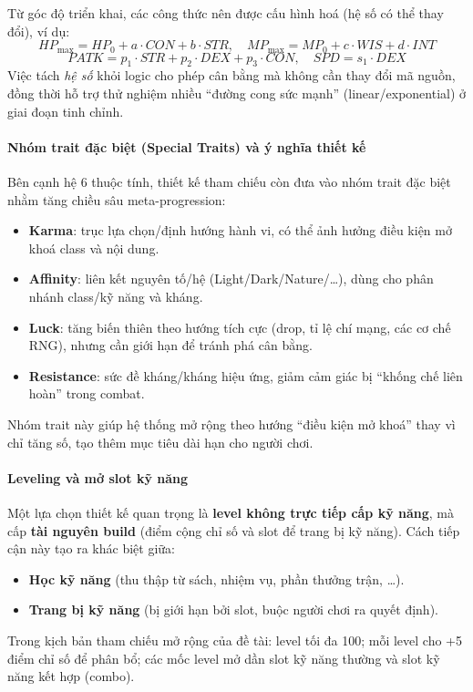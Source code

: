 Từ góc độ triển khai, các công thức nên được cấu hình hoá (hệ số có thể thay đổi), ví dụ:
\[
HP_{\max} = HP_0 + a\cdot CON + b\cdot STR,\quad
MP_{\max} = MP_0 + c\cdot WIS + d\cdot INT
\]
\[
PATK = p_1\cdot STR + p_2\cdot DEX + p_3\cdot CON,\quad
SPD = s_1\cdot DEX
\]
Việc tách \textit{hệ số} khỏi logic cho phép cân bằng mà không cần thay đổi mã nguồn, đồng thời hỗ trợ thử nghiệm nhiều ``đường cong sức mạnh'' (linear/\allowbreak exponential) ở giai đoạn tinh chỉnh\cite{adams-game-design}.

\paragraph{Nhóm trait đặc biệt (Special Traits) và ý nghĩa thiết kế}
Bên cạnh hệ 6 thuộc tính, thiết kế tham chiếu còn đưa vào nhóm trait đặc biệt nhằm tăng chiều sâu meta-progression:
\begin{itemize}
    \item \textbf{Karma}: trục lựa chọn/\allowbreak định hướng hành vi, có thể ảnh hưởng điều kiện mở khoá class và nội dung.
    \item \textbf{Affinity}: liên kết nguyên tố/\allowbreak hệ (Light/\allowbreak Dark/\allowbreak Nature/\ldots), dùng cho phân nhánh class/\allowbreak kỹ năng và kháng.
    \item \textbf{Luck}: tăng biến thiên theo hướng tích cực (drop, tỉ lệ chí mạng, các cơ chế RNG), nhưng cần giới hạn để tránh phá cân bằng.
    \item \textbf{Resistance}: sức đề kháng/\allowbreak kháng hiệu ứng, giảm cảm giác bị ``khống chế liên hoàn'' trong combat.
\end{itemize}
Nhóm trait này giúp hệ thống mở rộng theo hướng ``điều kiện mở khoá'' thay vì chỉ tăng số, tạo thêm mục tiêu dài hạn cho người chơi.

\paragraph{Leveling và mở slot kỹ năng}
Một lựa chọn thiết kế quan trọng là \textbf{level không trực tiếp cấp kỹ năng}, mà cấp \textbf{tài nguyên build} (điểm cộng chỉ số và slot để trang bị kỹ năng). Cách tiếp cận này tạo ra khác biệt giữa:
\begin{itemize}
    \item \textbf{Học kỹ năng} (thu thập từ sách, nhiệm vụ, phần thưởng trận, \ldots).
    \item \textbf{Trang bị kỹ năng} (bị giới hạn bởi slot, buộc người chơi ra quyết định).
\end{itemize}
Trong kịch bản tham chiếu mở rộng của đề tài: level tối đa 100; mỗi level cho +5 điểm chỉ số để phân bổ; các mốc level mở dần slot kỹ năng thường và slot kỹ năng kết hợp (combo).

